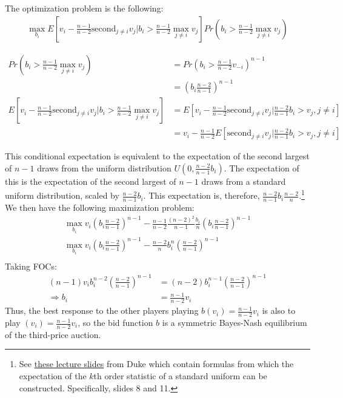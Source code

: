 \documentclass[11pt]{article} %
\begin{document}
The optimization problem is the following:
\begin{align*}
\max_{b_i}E[v_i - \frac{n-1}{n-2}\text{second}_{j \neq i}v_j|b_i>\frac{n-1}{n-2}\max_{j\neq i} v_j]Pr(b_i>\frac{n-1}{n-2}\max_{j\neq i} v_j) 
\end{align*}

\begin{align*}
Pr(b_i>\frac{n-1}{n-2}\max_{j\neq i} v_j) &= Pr\left(b_i>\frac{n-1}{n-2}v_{-i}\right)^{n-1}\\
&= \left(b_i\frac{n-2}{n-1}\right)^{n-1}\\
E[v_i - \frac{n-1}{n-2}\text{second}_{j \neq i}v_j|b_i>\frac{n-1}{n-2}\max_{j\neq i} v_j]  &= E[v_i - \frac{n-1}{n-2}\text{second}_{j \neq i}v_j|\frac{n-2}{n-1}b_i>v_{j}, j\neq i ] \\
&= v_i - \frac{n-1}{n-2}E[\text{second}_{j \neq i}v_j|\frac{n-2}{n-1}b_i>v_{j}, j\neq i ]
\end{align*}

This conditional expectation is equivalent to the expectation of the second largest of $n-1$ draws from the uniform distribution $U\left(0,\frac{n-2}{n-1}b_i\right)$. The expectation of this is the expectation of the second largest of $n-1$ draws from a standard uniform distribution, scaled by $\frac{n-2}{n-1}b_i$. This expectation is, therefore, $\frac{n-2}{n-1}b_i \frac{n-2}{n}$.\footnote{See \href{https://www2.stat.duke.edu/courses/Spring12/sta104.1/Lectures/Lec15.pdf}{these lecture slides} from Duke which contain formulas from which the expectation of the $k$th order statistic of a standard uniform can be constructed. Specifically, slides 8 and 11.} We then have the following maximization problem:
\begin{align*}
\max_{b_i} v_i \left(b_i\frac{n-2}{n-1}\right)^{n-1} - \frac{n-1}{n-2} \frac{(n-2)^2}{n-1} \frac{b_i}{n} \left(b_i\frac{n-2}{n-1}\right)^{n-1}\\
\max_{b_i} v_i \left(b_i\frac{n-2}{n-1}\right)^{n-1} -   \frac{n-2}{n} b_i^n\left(\frac{n-2}{n-1}\right)^{n-1}\\
\end{align*}
Taking FOCs:
\begin{align*}
(n-1)v_ib_i^{n-2}\left(\frac{n-2}{n-1}\right)^{n-1} &= (n-2)b_i^{n-1}\left(\frac{n-2}{n-1} \right)^{n-1}\\
\Rightarrow b_i &= \frac{n-1}{n-2}v_i
\end{align*}
Thus, the best response to the other players playing $b(v_i) = \frac{n-1}{n-2}v_i$ is also to play $(v_i) = \frac{n-1}{n-2}v_i$, so the bid function $b$ is a symmetric Bayes-Nash equilibrium of the third-price auction.
\end{document}

